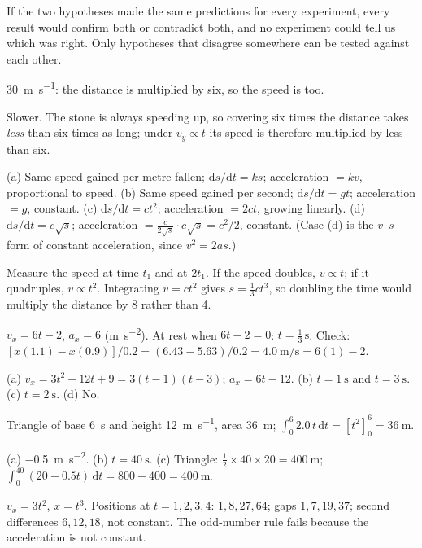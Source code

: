 \documentclass[11pt,twoside,openany]{book}
\newcommand{\dd}{\mathrm{d}}
\begin{document}
\begin{description}[leftmargin=2.6em,itemsep=3pt,style=sameline]
  \item[2.1] If the two hypotheses made the same predictions for every experiment, every result would confirm both or contradict both, and no experiment could tell us which was right. Only hypotheses that disagree somewhere can be tested against each other.
  \item[2.2] \SI{30}{\metre\per\second}: the distance is multiplied by six, so the speed is too.
  \item[2.3] Slower. The stone is always speeding up, so covering six times the distance takes \emph{less} than six times as long; under $v_y \propto t$ its speed is therefore multiplied by less than six.
  \item[2.4] (a) Same speed gained per metre fallen; $\dd s/\dd t = ks$; acceleration $= kv$, proportional to speed. (b) Same speed gained per second; $\dd s/\dd t = gt$; acceleration $= g$, constant. (c) $\dd s/\dd t = ct^2$; acceleration $= 2ct$, growing linearly. (d) $\dd s/\dd t = c\sqrt{s}$; acceleration $= \frac{c}{2\sqrt{s}}\cdot c\sqrt{s} = c^2/2$, constant. (Case (d) is the $v$--$s$ form of constant acceleration, since $v^2 = 2as$.)
  \item[2.5] Measure the speed at time $t_1$ and at $2t_1$. If the speed doubles, $v \propto t$; if it quadruples, $v \propto t^2$. Integrating $v = ct^2$ gives $s = \tfrac13 c t^3$, so doubling the time would multiply the distance by \num{8} rather than \num{4}.
  \item[2.6] $v_x = 6t - 2$, $a_x = 6$ (\si{\metre\per\second\squared}). At rest when $6t - 2 = 0$: $t = \tfrac13\,\si{\second}$. Check: $[x(1.1) - x(0.9)]/0.2 = (6.43 - 5.63)/0.2 = \SI{4.0}{\metre\per\second} = 6(1) - 2$.
  \item[2.7] (a) $v_x = 3t^2 - 12t + 9 = 3(t-1)(t-3)$; $a_x = 6t - 12$. (b) $t = \SI{1}{\second}$ and $t = \SI{3}{\second}$. (c) $t = \SI{2}{\second}$. (d) No.
  \item[2.9] Triangle of base \SI{6}{\second} and height \SI{12}{\metre\per\second}, area \SI{36}{\metre}; $\int_0^6 2.0\,t\,\dd t = [t^2]_0^6 = \SI{36}{\metre}$.
  \item[2.10] (a) \SI{-0.5}{\metre\per\second\squared}. (b) $t = \SI{40}{\second}$. (c) Triangle: $\tfrac12 \times 40 \times 20 = \SI{400}{\metre}$; $\int_0^{40}(20 - 0.5t)\,\dd t = 800 - 400 = \SI{400}{\metre}$.
  \item[2.11] $v_x = 3t^2$, $x = t^3$. Positions at $t = 1, 2, 3, 4$: $1, 8, 27, 64$; gaps $1, 7, 19, 37$; second differences $6, 12, 18$, not constant. The odd-number rule fails because the acceleration is not constant.

\end{description}
\end{document}
